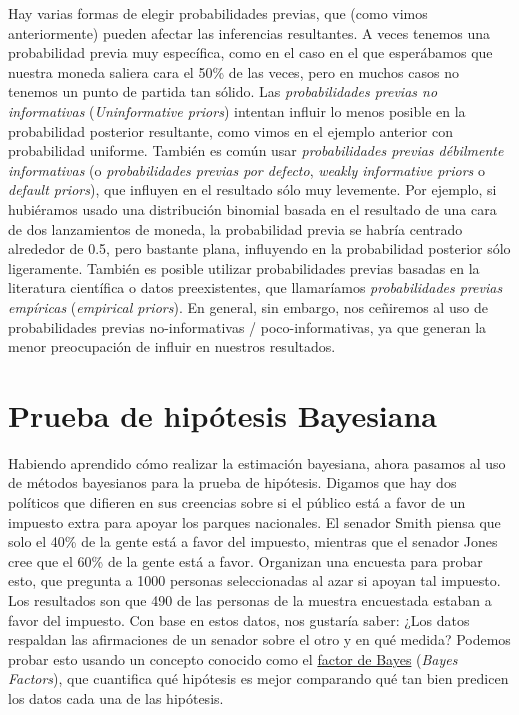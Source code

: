 \documentclass[
  12pt,
]{book}
\begin{document}
Hay varias formas de elegir probabilidades previas, que (como vimos anteriormente) pueden afectar las inferencias resultantes. A veces tenemos una probabilidad previa muy específica, como en el caso en el que esperábamos que nuestra moneda saliera cara el 50\% de las veces, pero en muchos casos no tenemos un punto de partida tan sólido. Las \emph{probabilidades previas no informativas} (\emph{Uninformative priors}) intentan influir lo menos posible en la probabilidad posterior resultante, como vimos en el ejemplo anterior con probabilidad uniforme. También es común usar \emph{probabilidades previas débilmente informativas} (o \emph{probabilidades previas por defecto}, \emph{weakly informative priors} o \emph{default priors}), que influyen en el resultado sólo muy levemente. Por ejemplo, si hubiéramos usado una distribución binomial basada en el resultado de una cara de dos lanzamientos de moneda, la probabilidad previa se habría centrado alrededor de 0.5, pero bastante plana, influyendo en la probabilidad posterior sólo ligeramente. También es posible utilizar probabilidades previas basadas en la literatura científica o datos preexistentes, que llamaríamos \emph{probabilidades previas empíricas} (\emph{empirical priors}). En general, sin embargo, nos ceñiremos al uso de probabilidades previas no-informativas / poco-informativas, ya que generan la menor preocupación de influir en nuestros resultados.

\hypertarget{prueba-de-hipuxf3tesis-bayesiana}{%
\section{Prueba de hipótesis Bayesiana}\label{prueba-de-hipuxf3tesis-bayesiana}}

Habiendo aprendido cómo realizar la estimación bayesiana, ahora pasamos al uso de métodos bayesianos para la prueba de hipótesis. Digamos que hay dos políticos que difieren en sus creencias sobre si el público está a favor de un impuesto extra para apoyar los parques nacionales. El senador Smith piensa que solo el 40\% de la gente está a favor del impuesto, mientras que el senador Jones cree que el 60\% de la gente está a favor. Organizan una encuesta para probar esto, que pregunta a 1000 personas seleccionadas al azar si apoyan tal impuesto. Los resultados son que 490 de las personas de la muestra encuestada estaban a favor del impuesto. Con base en estos datos, nos gustaría saber: ¿Los datos respaldan las afirmaciones de un senador sobre el otro y en qué medida? Podemos probar esto usando un concepto conocido como el \href{https://bayesfactor.blogspot.com/2014/02/the-bayesfactor-package-this-blog-is.html}{factor de Bayes} (\emph{Bayes Factors}), que cuantifica qué hipótesis es mejor comparando qué tan bien predicen los datos cada una de las hipótesis.
\end{document}
